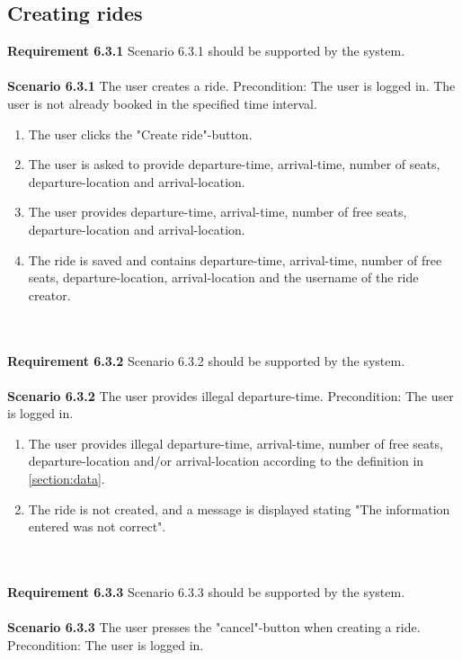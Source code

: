 \documentclass{article}
\begin{document}
\subsection{Creating rides}
\textbf{Requirement 6.3.1} Scenario 6.3.1 should be supported by the system.
\\ \\
\textbf{Scenario 6.3.1} The user creates a ride. Precondition: The user is logged in. The user is not already booked in the specified time interval.
\\
\begin{enumerate}
    \item The user clicks the "Create ride"-button.
    \item The user is asked to provide departure-time, arrival-time, number of seats, departure-location and arrival-location. 
    \item The user provides departure-time, arrival-time, number of free seats, departure-location and arrival-location. 
    \item The ride is saved and contains departure-time, arrival-time, number of free seats, departure-location,  arrival-location and the username of the ride creator.
\end{enumerate}
\mbox{}\\ \\
\textbf{Requirement 6.3.2} Scenario 6.3.2 should be supported by the system.
\\ \\
\textbf{Scenario 6.3.2} The user provides illegal departure-time. Precondition: The user is logged in.

\begin{enumerate}
    \item The user provides illegal departure-time, arrival-time, number of free seats, departure-location and/or arrival-location according to the definition in \ref{section:data}.
    \item The ride is not created, and a message is displayed stating "The information entered was not correct".  
\end{enumerate}
\mbox{}\\ \\
\textbf{Requirement 6.3.3} Scenario 6.3.3 should be supported by the system.
\\ \\
\textbf{Scenario 6.3.3} The user presses the "cancel"-button when creating a ride. Precondition: The user is logged in.
\end{document}
